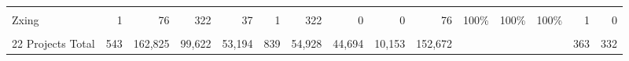 \begin{table*}[t]
\begin{tabular}{l|rrr|rr|rrrrrrr|rr}
\cellcolor{gray!6}{Handlebars.java}&\cellcolor{gray!6}{1}&\cellcolor{gray!6}{147}&\cellcolor{gray!6}{411}&\cellcolor{gray!6}{61}&\cellcolor{gray!6}{1}&\cellcolor{gray!6}{0}&\cellcolor{gray!6}{411}&\cellcolor{gray!6}{16}&\cellcolor{gray!6}{131}&\cellcolor{gray!6}{0\%}&\cellcolor{gray!6}{0\%}&\cellcolor{gray!6}{89\%}&\cellcolor{gray!6}{0}&\cellcolor{gray!6}{1}\\
Zxing&1&76&322&37&1&322&0&0&76&100\%&100\%&100\%&1&0\\
\cellcolor{gray!6}{Ninja}&\cellcolor{gray!6}{1}&\cellcolor{gray!6}{209}&\cellcolor{gray!6}{476}&\cellcolor{gray!6}{6}&\cellcolor{gray!6}{1}&\cellcolor{gray!6}{0}&\cellcolor{gray!6}{476}&\cellcolor{gray!6}{90}&\cellcolor{gray!6}{119}&\cellcolor{gray!6}{0\%}&\cellcolor{gray!6}{0\%}&\cellcolor{gray!6}{56\%}&\cellcolor{gray!6}{0}&\cellcolor{gray!6}{1}\\
\midrule
22 Projects Total &543&162,825&99,622&53,194&839&54,928&44,694&10,153&152,672&&&&363&332\\



\bottomrule
\end{tabular}

\label{nonunique}
\vspace{-10pt}
\end{table*}
